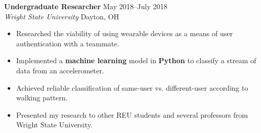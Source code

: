 \documentclass[10pt]{article}
\newcommand{\ressubheading}[4]{
    \textbf{#1} \hfill #2 \\[0pt]
    \textit{#3} \hfill #4 \\[0pt]
}
\newenvironment{resitemize}{
    \vspace{-6pt}
    \begin{itemize}
    \setlength\itemsep{-2pt}
}{
    \end{itemize}
}
\begin{document}
\begin{NoHyper}
\ressubheading
	{Undergraduate Researcher}
	{May 2018--July 2018}
	{Wright State University}
	{Dayton, OH}
    \begin{resitemize}
        \item Researched the viability of using wearable devices as a means of user authentication with a teammate.
        \item Implemented a \textbf{machine learning} model in \textbf{Python} to classify a stream of data from an accelerometer.
        \item Achieved reliable classification of same-user vs. different-user according to walking pattern.
        \item Presented my research to other REU students and several professors from Wright State University.
    \end{resitemize}

    

\end{NoHyper}
\end{document}
